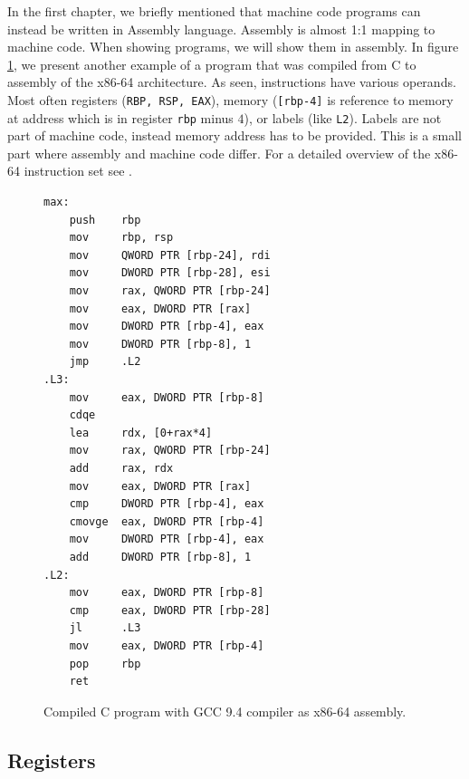 In the first chapter, we briefly mentioned that machine code programs can
instead be written in Assembly language. Assembly is almost 1:1 mapping to
machine code. When showing programs, we will show them in assembly. In figure
\ref{fig:assembly-example2}, we present another example of a program that was
compiled from C to assembly of the x86-64 architecture. As seen, instructions have
various operands. Most often registers (\texttt{RBP, RSP, EAX}), memory
(\texttt{[rbp-4]} is reference to memory at address which is in register
\texttt{rbp} minus $4$), or labels (like \texttt{L2}). Labels are not part of
machine code, instead memory address has to be provided. This is a small part
where assembly and machine code differ. For a detailed overview of the x86-64
instruction set see \cite{intel-manual}.

\begin{figure}\label{fig:assembly-example2}
    \begin{lstlisting}
max:
    push    rbp
    mov     rbp, rsp
    mov     QWORD PTR [rbp-24], rdi
    mov     DWORD PTR [rbp-28], esi
    mov     rax, QWORD PTR [rbp-24]
    mov     eax, DWORD PTR [rax]
    mov     DWORD PTR [rbp-4], eax
    mov     DWORD PTR [rbp-8], 1
    jmp     .L2
.L3:
    mov     eax, DWORD PTR [rbp-8]
    cdqe
    lea     rdx, [0+rax*4]
    mov     rax, QWORD PTR [rbp-24]
    add     rax, rdx
    mov     eax, DWORD PTR [rax]
    cmp     DWORD PTR [rbp-4], eax
    cmovge  eax, DWORD PTR [rbp-4]
    mov     DWORD PTR [rbp-4], eax
    add     DWORD PTR [rbp-8], 1
.L2:
    mov     eax, DWORD PTR [rbp-8]
    cmp     eax, DWORD PTR [rbp-28]
    jl      .L3
    mov     eax, DWORD PTR [rbp-4]
    pop     rbp
    ret
    \end{lstlisting}
    \caption{Compiled C program with GCC 9.4 compiler as x86-64 assembly.}
\end{figure}

\subsection{Registers}\label{subsection:registers}

